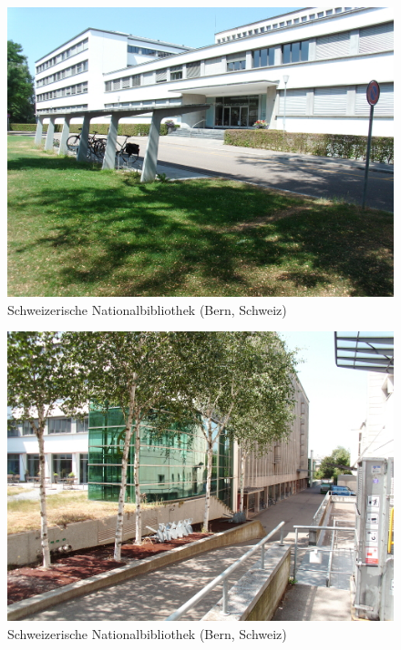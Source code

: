 \documentclass[a4paper,
fontsize=11pt,
oneside,
numbers=noperiodatend,
parskip=half-,
bibliography=totoc,
final
]{scrartcl}
\begin{document}
\begin{figure}[htbp]
\centering
\includegraphics{./img/005.jpg}
\caption{Schweizerische Nationalbibliothek (Bern,
Schweiz)}
\end{figure}

\begin{figure}[htbp]
\centering
\includegraphics{./img/006.jpg}
\caption{Schweizerische Nationalbibliothek (Bern,
Schweiz)}
\end{figure}
\end{document}
